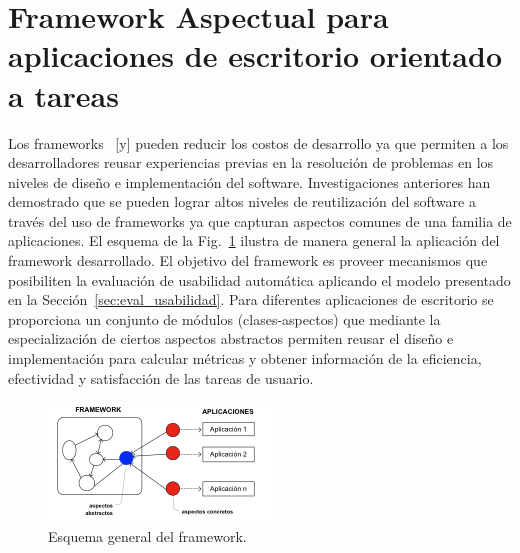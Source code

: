 \section{Framework Aspectual para aplicaciones de escritorio orientado a tareas}
\label{sec:framework_aspectual}

Los frameworks~\cite{JOHNSON1997} [y] pueden reducir los costos de desarrollo ya que permiten a los desarrolladores reusar experiencias previas en la resolución de problemas en los niveles de diseño e implementación del software. Investigaciones anteriores han demostrado que se pueden lograr altos niveles de reutilización del software a través del uso de frameworks ya que capturan aspectos comunes de una familia de aplicaciones. 
El esquema de la Fig.~\ref{fig:fig2} ilustra de manera general la aplicación del framework desarrollado. El objetivo del framework es proveer mecanismos que posibiliten la evaluación de usabilidad automática aplicando el modelo presentado en la Sección~\ref{sec:eval_usabilidad}. Para diferentes aplicaciones de escritorio se proporciona un conjunto de módulos (clases-aspectos) que mediante la especialización de ciertos aspectos abstractos permiten reusar el diseño e implementación para calcular métricas y obtener información de la eficiencia, efectividad y satisfacción de las tareas de usuario.

\begin{figure}[ht!]
	\centering
	\includegraphics[scale=1]{figs/fig2.png}
	\caption{\label{fig:fig2} Esquema general del framework.}
\end{figure}



